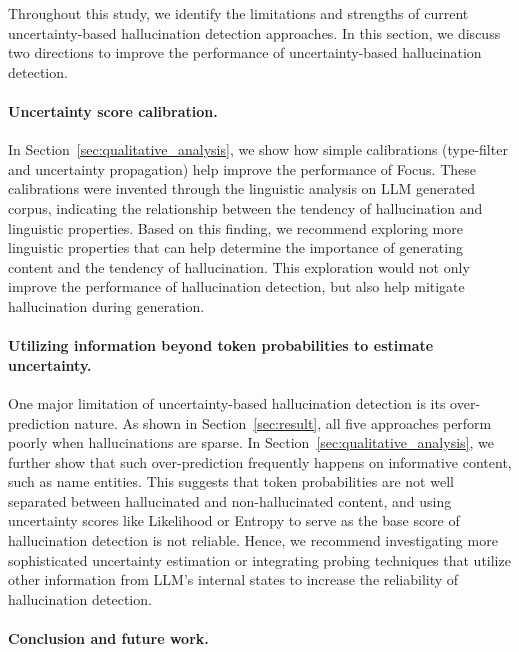 Throughout this study, we identify the limitations and strengths of current uncertainty-based hallucination detection approaches. In this section, we discuss two directions to improve the performance of uncertainty-based hallucination detection.

\vspace{-0.1cm}
\paragraph{Uncertainty score calibration.}

In Section~\ref{sec:qualitative_analysis}, we show how simple calibrations (type-filter and uncertainty propagation) help improve the performance of Focus. These calibrations were invented through the linguistic analysis on LLM generated corpus, indicating the relationship between the tendency of hallucination and linguistic properties. Based on this finding, we recommend exploring more linguistic properties that can help determine the importance of generating content and the tendency of hallucination. This exploration would not only improve the performance of hallucination detection, but also help mitigate hallucination during generation.

\vspace{-0.1cm}
\paragraph{Utilizing information beyond token probabilities to estimate uncertainty.}
One major limitation of uncertainty-based hallucination detection is its over-prediction nature. As shown in Section~\ref{sec:result}, all five approaches perform poorly when hallucinations are sparse. In Section~\ref{sec:qualitative_analysis}, we further show that such over-prediction frequently happens on informative content, such as name entities. This suggests that token probabilities are not well separated between hallucinated and non-hallucinated content, and using uncertainty scores like Likelihood or Entropy to serve as the base score of hallucination detection is not reliable. Hence, we recommend investigating more sophisticated uncertainty estimation or integrating probing techniques that utilize other information from LLM's internal states to increase the reliability of hallucination detection.

\vspace{-0.1cm}
\paragraph{Conclusion and future work.}

